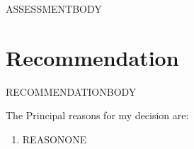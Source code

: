 \documentclass[11pt]{article}
\begin{document}
ASSESSMENTBODY
\section*{Recommendation}
RECOMMENDATIONBODY

The Principal reasons for my decision are:
\begin{enumerate}
\item REASONONE
\end{enumerate}
\end{document}
